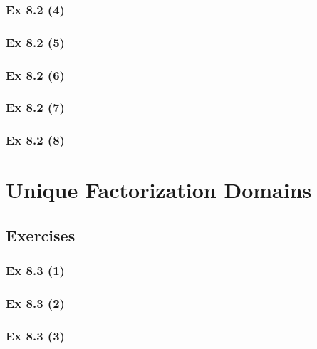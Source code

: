 \subsubsection{Ex 8.2 (4)}\label{sec:Ex_8.2.4}

\subsubsection{Ex 8.2 (5)}\label{sec:Ex_8.2.5}

\subsubsection{Ex 8.2 (6)}\label{sec:Ex_8.2.6}

\subsubsection{Ex 8.2 (7)}\label{sec:Ex_8.2.7}

\subsubsection{Ex 8.2 (8)}\label{sec:Ex_8.2.8}

\newpage		%

\section{Unique Factorization Domains}\label{sec:8.3}	
\subsection*{Exercises}\label{sec:8.3_Exercises}

\subsubsection{Ex 8.3 (1)}\label{sec:Ex_8.3.1}

\subsubsection{Ex 8.3 (2)}\label{sec:Ex_8.3.2}

\subsubsection{Ex 8.3 (3)}\label{sec:Ex_8.3.3}

